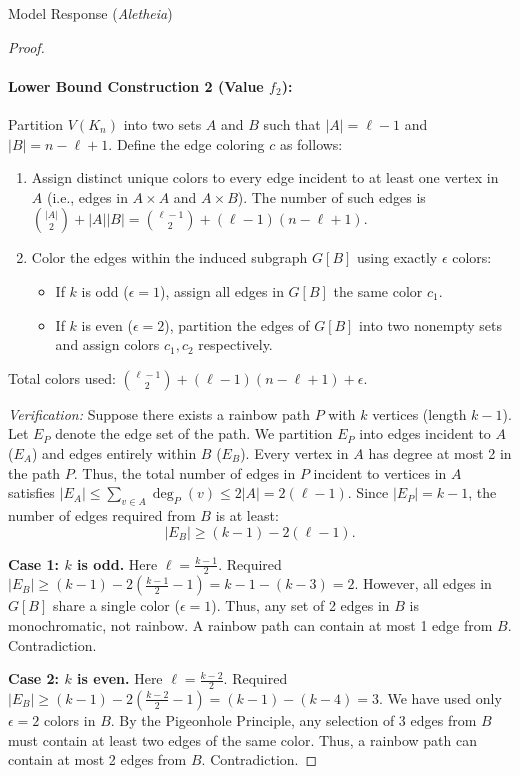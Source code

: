 \documentclass[11pt]{article}
\begin{document}
\begin{solution}{Model Response (\emph{Aletheia})}
\begin{proof}
\paragraph{Lower Bound Construction 2 (Value $f_2$):}
Partition $V(K_n)$ into two sets $A$ and $B$ such that $|A| = \ell - 1$ and $|B| = n - \ell + 1$.
Define the edge coloring $c$ as follows:
\begin{enumerate}
    \item Assign distinct unique colors to every edge incident to at least one vertex in $A$ (i.e., edges in $A \times A$ and $A \times B$).
    The number of such edges is $\binom{|A|}{2} + |A||B| = \binom{\ell-1}{2} + (\ell-1)(n-\ell+1)$.
    \item Color the edges within the induced subgraph $G[B]$ using exactly $\epsilon$ colors:
    \begin{itemize}
        \item If $k$ is odd ($\epsilon=1$), assign all edges in $G[B]$ the same color $c_1$.
        \item If $k$ is even ($\epsilon=2$), partition the edges of $G[B]$ into two nonempty sets and assign colors $c_1, c_2$ respectively.
    \end{itemize}
\end{enumerate}
Total colors used: $\binom{\ell-1}{2} + (\ell-1)(n-\ell+1) + \epsilon$.



\textit{Verification:} Suppose there exists a rainbow path $P$ with $k$ vertices (length $k-1$).
Let $E_P$ denote the edge set of the path. We partition $E_P$ into edges incident to $A$ ($E_A$) and edges entirely within $B$ ($E_B$).
Every vertex in $A$ has degree at most 2 in the path $P$. Thus, the total number of edges in $P$ incident to vertices in $A$ satisfies $|E_A| \le \sum_{v \in A} \deg_P(v) \le 2|A| = 2(\ell - 1)$.
Since $|E_P| = k-1$, the number of edges required from $B$ is at least:
\[ |E_B| \ge (k-1) - 2(\ell - 1). \]

\textbf{Case 1: $k$ is odd.}
Here $\ell = \frac{k-1}{2}$.
Required $|E_B| \ge (k-1) - 2(\frac{k-1}{2} - 1) = k - 1 - (k - 3) = 2$.
However, all edges in $G[B]$ share a single color ($\epsilon=1$). Thus, any set of 2 edges in $B$ is monochromatic, not rainbow. A rainbow path can contain at most 1 edge from $B$. Contradiction.

\textbf{Case 2: $k$ is even.}
Here $\ell = \frac{k-2}{2}$.
Required $|E_B| \ge (k-1) - 2(\frac{k-2}{2} - 1) = (k-1) - (k-4) = 3$.
We have used only $\epsilon=2$ colors in $B$. By the Pigeonhole Principle, any selection of 3 edges from $B$ must contain at least two edges of the same color. Thus, a rainbow path can contain at most 2 edges from $B$. Contradiction.


\end{proof}
\end{solution}
\end{document}
